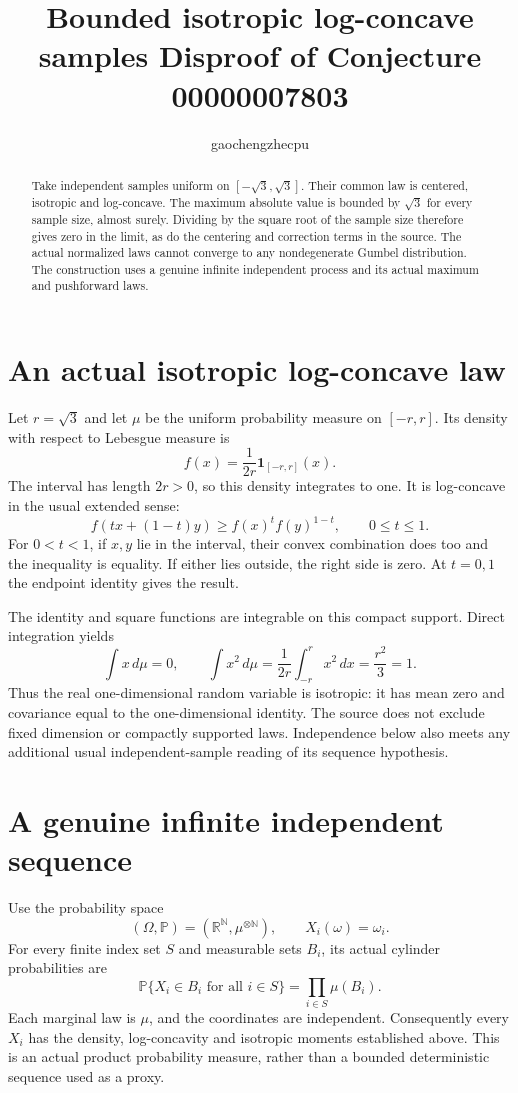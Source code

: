 \documentclass[11pt]{article}
\title{Bounded isotropic log-concave samples\newline
\large Disproof of Conjecture 00000007803}
\author{gaochengzhecpu}\date{}
\begin{document}
\maketitle
\begin{abstract}
Take independent samples uniform on $[-\sqrt3,\sqrt3]$.
Their common law is centered, isotropic and log-concave.
The maximum absolute value is bounded by $\sqrt3$ for
every sample size, almost surely. Dividing by the square
root of the sample size therefore gives zero in the
limit, as do the centering and correction terms in the
source. The actual normalized laws cannot converge to
any nondegenerate Gumbel distribution. The construction
uses a genuine infinite independent process and its
actual maximum and pushforward laws.
\end{abstract}

\section*{An actual isotropic log-concave law}
Let $r=\sqrt3$ and let $\mu$ be the uniform probability
measure on $[-r,r]$. Its density with respect to
Lebesgue measure is
\[
       f(x)=\frac1{2r}\boldsymbol1_{[-r,r]}(x).
\]
The interval has length $2r>0$, so this density
integrates to one. It is log-concave in the usual
extended sense:
\[
 f(tx+(1-t)y)\geq f(x)^t f(y)^{1-t},
                         \qquad 0\leq t\leq1.
\]
For $0<t<1$, if $x,y$ lie in the interval, their convex
combination does too and the inequality is equality.
If either lies outside, the right side is zero.
At $t=0,1$ the endpoint identity gives the result.

The identity and square functions are integrable on
this compact support. Direct integration yields
\[
 \int x\,d\mu=0,\qquad
 \int x^2\,d\mu=\frac1{2r}\int_{-r}^{r}x^2\,dx
                =\frac{r^2}{3}=1.
\]
Thus the real one-dimensional random variable is
isotropic: it has mean zero and covariance equal to
the one-dimensional identity. The source does not
exclude fixed dimension or compactly supported laws.
Independence below also meets any additional usual
independent-sample reading of its sequence hypothesis.

\newpage
\section*{A genuine infinite independent sequence}
Use the probability space
\[
 (\Omega,\mathbb P)=
       (\mathbb R^{\mathbb N},\mu^{\otimes\mathbb N}),
             \qquad X_i(\omega)=\omega_i.
\]
For every finite index set $S$ and measurable sets $B_i$,
its actual cylinder probabilities are
\[
 \mathbb P\{X_i\in B_i\text{ for all }i\in S\}
                         =\prod_{i\in S}\mu(B_i).
\]
Each marginal law is $\mu$, and the coordinates are
independent. Consequently every $X_i$ has the density,
log-concavity and isotropic moments established above.
This is an actual product probability measure, rather
than a bounded deterministic sequence used as a proxy.
\end{document}
